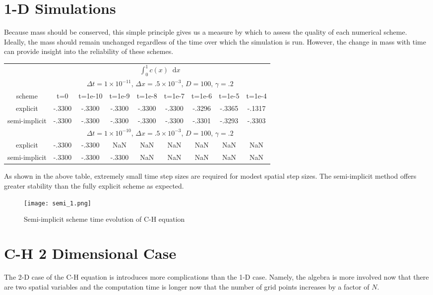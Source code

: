 \documentclass[]{article}
\theoremstyle{definition}
\newcommand*\diff{\mathop{}\!\mathrm{d}}
\numberwithin{equation}{section}
\numberwithin{equation}{section}
\begin{document}
	\section{1-D Simulations}
	Because mass should be conserved, this simple principle gives us a measure by which to assess the quality of each numerical scheme. Ideally, the mass should remain unchanged regardless of the time over which the simulation is run. However, the change in mass with time can provide insight into the reliability of these schemes.
	\begin{center}
	\begin{tabular} {c|c|c|c|c|c|c|c|c|}
		\cline{2-9}
		&  \multicolumn{8}{c|}{$\int_{0}^{1}c(x) \diff{x}$} \\  \cline{2-9}
		&  \multicolumn{8}{c|}{$\Delta t=1\times10^{-11}$, $\Delta x = .5\times 10^{-3}$, $D = 100$, $\gamma = .2$} \\ \cline{2-9} 
		scheme & t=0 & t=1e-10 & t=1e-9 & t=1e-8 & t=1e-7 & t=1e-6 & t=1e-5 & t=1e-4 \\ 
		\hline
		\multicolumn{1}{|c|}{explicit} & -.3300 &  -.3300 &  -.3300&  -.3300 & -.3300 & -.3296 & -.3365 & -.1317 \\
		\hline
		\multicolumn{1}{|c|}{semi-implicit} & -.3300 & -.3300 & -.3300 & -.3300 & -.3300 & -.3301 & -.3293 & -.3303  \\
		\hline
		&  \multicolumn{8}{c|}{$\Delta t=1\times10^{-10}$, $\Delta x = .5\times 10^{-3}$, $D = 100$, $\gamma = .2$} \\ \cline{2-9} 
		\hline
		\multicolumn{1}{|c|}{explicit} & -.3300 &  -.3300 &  NaN &  NaN & NaN & NaN & NaN & NaN \\
		\hline
		\multicolumn{1}{|c|}{semi-implicit} & -.3300 & -.3300 & -.3300 & NaN & NaN & NaN & NaN & NaN  \\
		\hline
	\end{tabular}
	\end{center}
As shown in the above table, extremely small time step sizes are required for modest spatial step sizes. The semi-implicit method offers greater stability than the fully explicit scheme as expected.
		\begin{center}
	\begin{figure}[H]
		\centering
		\texttt{[image: semi\_1.png]} 
		\caption{Semi-implicit scheme time evolution of C-H equation}
		\label{fig:semi_1}
	\end{figure}
\end{center}
\section{C-H 2 Dimensional Case}
The 2-D case of the C-H equation is introduces more complications than the 1-D case. Namely, the algebra is more involved now that there are two spatial variables and the computation time is longer now that the number of grid points increases by a factor of $N$.
\end{document}
